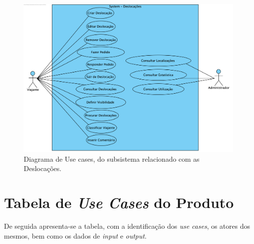 \begin{figure}[H]
    \centering
	\includegraphics[scale=0.95]{imagens/diagrama-use-cases-2.png}
	\caption{Diagrama de Use cases, do subsistema relacionado com as Deslocações.}
	\label{img:duc2}
\end{figure}

\section{Tabela de \emph{Use Cases} do Produto}
\hspace{5mm} De seguida apresenta-se a tabela, com a identificação dos \emph{use cases}, os atores dos mesmos, bem como os dados de \emph{input} e \emph{output}.

